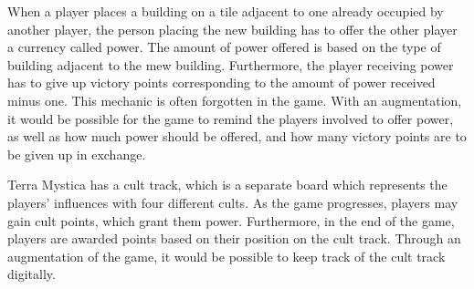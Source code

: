 When a player places a building on a tile adjacent to one already occupied by another player, the person placing the new building has to offer the other player a currency called power. The amount of power offered is based on the type of building adjacent to the mew building. Furthermore, the player receiving power has to give up victory points corresponding to the amount of power received minus one. This mechanic is often forgotten in the game. With an augmentation, it would be possible for the game to remind the players involved to offer power, as well as how much power should be offered, and how many victory points are to be given up in exchange.

Terra Mystica has a cult track, which is a separate board which represents the players' influences with four different cults. As the game progresses, players may gain cult points, which grant them power. Furthermore, in the end of the game, players are awarded points based on their position on the cult track. Through an augmentation of the game, it would be possible to keep track of the cult track digitally.
